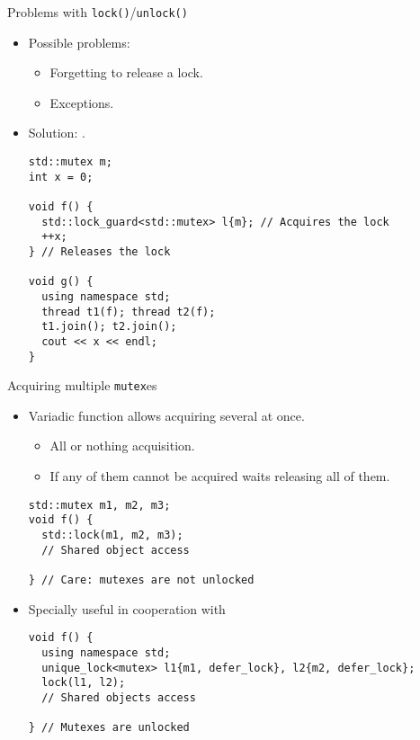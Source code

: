 \begin{frame}[t,fragile]{Problems with \texttt{lock()}/\texttt{unlock()}}
\begin{itemize}
  \item Possible problems:
    \begin{itemize}
      \item Forgetting to release a lock.
      \item Exceptions.
    \end{itemize}
  \item Solution: .
\begin{lstlisting}
std::mutex m;
int x = 0;

void f() {
  std::lock_guard<std::mutex> l{m}; // Acquires the lock
  ++x;
} // Releases the lock

void g() {
  using namespace std;
  thread t1(f); thread t2(f);
  t1.join(); t2.join();
  cout << x << endl;
}
\end{lstlisting}
\end{itemize}
\end{frame}

\begin{frame}[t,fragile]{Acquiring multiple \texttt{mutex}es}
\begin{itemize}
  \item Variadic  function allows acquiring
        several  at once.
    \begin{itemize}
      \item All or nothing acquisition.
      \item If any of them cannot be acquired waits releasing all of them.
    \end{itemize}
\begin{lstlisting}
std::mutex m1, m2, m3;
void f() {
  std::lock(m1, m2, m3);
  // Shared object access

} // Care: mutexes are not unlocked
\end{lstlisting}

  \pause
  \item Specially useful in cooperation with 
\begin{lstlisting}
void f() {
  using namespace std;
  unique_lock<mutex> l1{m1, defer_lock}, l2{m2, defer_lock};
  lock(l1, l2);
  // Shared objects access

} // Mutexes are unlocked
\end{lstlisting}
\end{itemize}
\end{frame}

